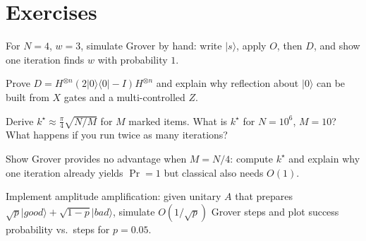 \section{Exercises}
\begin{exercise}
For $N=4$, $w=3$, simulate Grover by hand: write $\lvert s\rangle$, apply $O$, then $D$, and show one iteration finds $w$ with probability $1$.
\end{exercise}
\begin{exercise}
Prove $D= H^{\otimes n}(2\lvert0\rangle\langle0\rvert-I)H^{\otimes n}$ and explain why reflection about $\lvert0\rangle$ can be built from $X$ gates and a multi-controlled $Z$.
\end{exercise}
\begin{exercise}
Derive $k^\star\approx\frac{\pi}{4}\sqrt{N/M}$ for $M$ marked items. What is $k^\star$ for $N=10^6$, $M=10$? What happens if you run twice as many iterations?
\end{exercise}
\begin{exercise}
Show Grover provides no advantage when $M=N/4$: compute $k^\star$ and explain why one iteration already yields $\Pr=1$ but classical also needs $O(1)$.
\end{exercise}
\begin{exercise}
Implement amplitude amplification: given unitary $A$ that prepares $\sqrt p\lvert good\rangle+\sqrt{1-p}\lvert bad\rangle$, simulate $O(1/\sqrt p)$ Grover steps and plot success probability vs.\ steps for $p=0.05$.
\end{exercise}
